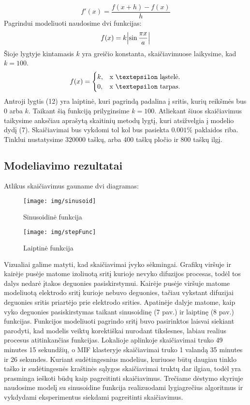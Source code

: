 \documentclass{VUMIFPSkursinis}
\begin{document}
\begin{equation}
f'(x) =\frac {f(x + h) - f(x)}{h}
\end{equation}
Pagrindui modeliuoti naudosime dvi funkcijas:
\begin{equation}
f(x) = k \abs{\sin \frac{\pi x}{a}}
\end{equation}
Šioje lygtyje kintamasis $k$ yra greičio konstanta, skaičiavimuose laikysime, kad $k = 100$.
\begin{equation}
f(x) = \begin{cases}
k, & \text{x \textepsilon \vspace{10 mm} ląstelė}.\\
0, & \text{x \textepsilon \vspace{10 mm} tarpas}.
\end{cases}
\end{equation}
Antroji lygtis (12) yra laiptinė, kuri pagrindą padalina į sritis, kurių reikšmės bus 0 arba $k$.
Taikant šią funkciją prilyginsime $k=100$.
Atliekant šiuos skaičiavimus taikysime anksčiau aprašytą skaitinių metodų lygtį, kuri atsižvelgia į modelio dydį (7).
Skaičiavimai bus vykdomi tol kol bus pasiekta $0.001\%$ paklaidos riba.
Tinklui nustatysime 320000 taškų, arba 400 taškų pločio ir 800 taškų ilgį.
\subsection{Modeliavimo rezultatai}
Atlikus skaičiavimus gauname dvi diagramas:
\begin{figure}[H]
\centering
\texttt{[image: img/sinusoid]}
\caption{Sinusoidinė funkcija} %
\label{img:text}
\end{figure}
\begin{figure}[H]
\centering
\texttt{[image: img/stepFunc]}
\caption{Laiptinė funkcija} %
\label{img:text}
\end{figure}

Vizualiai galime matyti, kad skaičiavimai įvyko sėkmingai.
Grafikų viršuje ir kairėje pusėje matome izoliuotą sritį kurioje nevyko difuzijos procesas, todėl tos dalys nedarė įtakos deguonies pasiskirstymui.
Kairėje pusėje viršuje matome modeliuotą elektrodo sritį kurioje nebuvo deguonies, tačiau vykstant difuzijai deguonies sritis priartėjo prie elektrodo srities.
Apatinėje dalyje matome, kaip vyko deguonies pasiskirstymas taikant sinusoidinę (7 pav.) ir laiptinę (8 pav.) funkcijas.
Funkcijos modeliuoti pagrindo sritį buvo pasirinktos laisvai siekiant parodyti, kad modelis veiktų korektiškai nurodant tikslesnes, labiau realius procesus atitinkančias funkcijas.
Lokalioje aplinkoje skaičiavimai truko 49 minutes 15 sekundžių, o MIF klasteryje skaičiavimai truko 1 valandą 35 minutes ir 26 sekundes.
Kuriant sudėtingesnius modelius, kuriuose būtų daugiau tinklo taško ir sudėtingesnės kraštinės sąlygos skaičiavimai truktų dar ilgiau, todėl yra prasminga ieškoti būdų kaip pagreitinti skaičiavimus.
Trečiame dėstymo skyriuje naudosime modelį su sinusoidine funkcija realizuodami lygiagrečius algoritmus ir vykdydami eksperimentus siekdami pagreitinti skaičiavimus.
\end{document}
